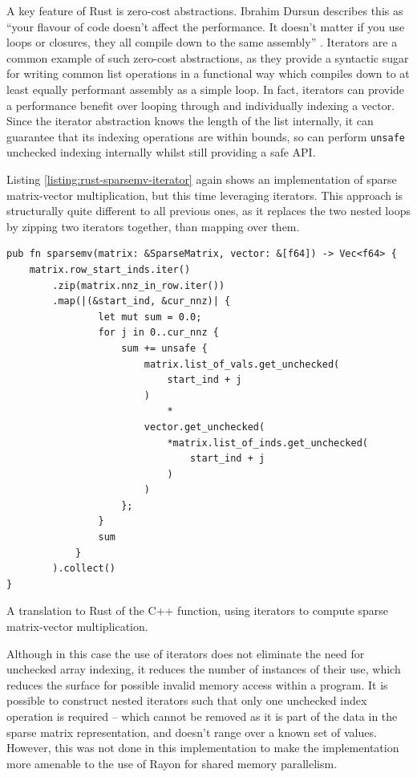 A key feature of Rust is zero-cost abstractions. Ibrahim Dursun describes this as ``your flavour of code doesn’t affect the performance. It doesn’t matter if you use loops or closures, they all compile down to the same assembly'' \cite{RustZeroCost2020}. Iterators are a common example of such zero-cost abstractions, as they provide a syntactic sugar for writing common list operations in a functional way which compiles down to at least equally performant assembly as a simple loop. In fact, iterators can provide a performance benefit over looping through and individually indexing a vector. Since the iterator abstraction knows the length of the list internally, it can guarantee that its indexing operations are within bounds, so can perform \texttt{unsafe} unchecked indexing internally whilst still providing a safe API.

Listing \ref{listing:rust-sparsemv-iterator} again shows an implementation of sparse matrix-vector multiplication, but this time leveraging iterators. This approach is structurally quite different to all previous ones, as it replaces the two nested loops by zipping two iterators together, than mapping over them. 

\begin{listing}[H]
    \begin{verbatim}
pub fn sparsemv(matrix: &SparseMatrix, vector: &[f64]) -> Vec<f64> {
    matrix.row_start_inds.iter()
        .zip(matrix.nnz_in_row.iter())
        .map(|(&start_ind, &cur_nnz)| {
                let mut sum = 0.0;
                for j in 0..cur_nnz {
                    sum += unsafe {
                        matrix.list_of_vals.get_unchecked(
                            start_ind + j
                        )
                            *
                        vector.get_unchecked(
                            *matrix.list_of_inds.get_unchecked(
                                start_ind + j
                            )
                        )
                    };
                }
                sum
            }
        ).collect()
}
    \end{verbatim}
    \caption{A translation to Rust of the C++ function, using iterators to compute sparse matrix-vector multiplication.}
    \label{listing:rust-sparsemv-iterator}
\end{listing}

Although in this case the use of iterators does not eliminate the need for unchecked array indexing, it reduces the number of instances of their use, which reduces the surface for possible invalid memory access within a program. It is possible to construct nested iterators such that only one unchecked index operation is required -- which cannot be removed as it is part of the data in the sparse matrix representation, and doesn't range over a known set of values. However, this was not done in this implementation to make the implementation more amenable to the use of Rayon for shared memory parallelism.

